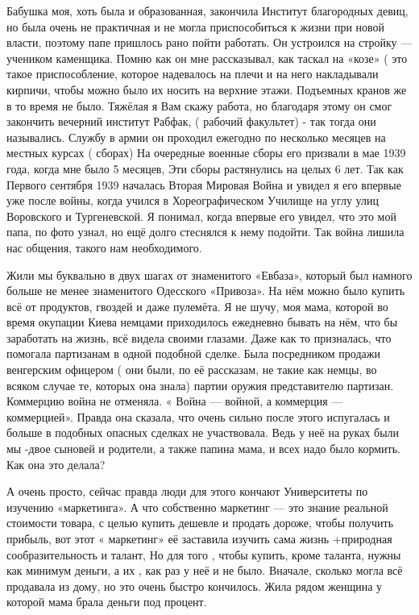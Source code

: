 
Бабушка моя, хоть была и образованная, закончила
Институт благородных девиц, но была очень не практичная  и не могла
приспособиться к жизни при новой власти, поэтому папе пришлось рано пойти
работать. Он устроился на стройку — учеником каменщика. Помню как он мне
рассказывал, как таскал на «козе» ( это такое приспособление, которое
надевалось на плечи и на него накладывали кирпичи, чтобы можно было их носить
на верхние этажи. Подъемных кранов же в то время не было. Тяжёлая я Вам скажу
работа, но благодаря этому он смог закончить вечерний институт  Рабфак, (
рабочий факультет) - так  тогда они назывались. Службу в армии он проходил
ежегодно по несколько месяцев  на  местных  курсах ( сборах)  На очередные
военные сборы его призвали  в мае 1939 года, когда мне было 5 месяцев, Эти
сборы растянулись на целых 6 лет. Так как Первого сентября 1939 началась Вторая
Мировая Война и увидел я его впервые уже после войны, когда учился в
Хореографическом Училище на углу улиц Воровского и Тургеневской.  Я понимал,
когда впервые его увидел, что это мой папа, по фото  узнал, но  ещё долго
стеснялся  к нему подойти. Так война лишила нас общения, такого  нам
необходимого.


Жили мы буквально в двух шагах от знаменитого «Евбаза», который был намного
больше не менее знаменитого Одесского «Привоза». На нём можно было купить всё
от продуктов, гвоздей и даже пулемёта. Я не шучу, моя мама, которой  во время
окупации Киева немцами приходилось ежедневно бывать на нём, что бы заработать
на жизнь, всё видела  своими глазами. Даже как то призналась, что помогала
партизанам  в одной подобной сделке. Была посредником продажи  венгерским
офицером ( они были, по её рассказам, не такие как немцы, во всяком случае те,
которых она знала)  партии оружия представителю партизан. Коммерцию война не
отменяла. « Война — войной, а коммерция — коммерцией». Правда она сказала, что
очень сильно после этого испугалась и больше в подобных опасных сделках не
участвовала. Ведь у неё на руках были мы -двое сыновей и родители, а также
папина мама, и всех  надо было кормить.    Как она это делала?

А очень просто, сейчас правда люди для этого кончают Университеты по изучению
«маркетинга». А что собственно маркетинг — это знание реальной стоимости
товара, с целью купить дешевле и продать дороже, чтобы получить прибыль, вот
этот « маркетинг» её заставила изучить сама  жизнь +природная сообразительность
и талант, Но для того , чтобы купить, кроме таланта, нужны как минимум деньги,
а их , как раз у неё и не было. Вначале, сколько могла всё продавала из дому,
но это очень быстро кончилось.  Жила рядом женщина у которой мама  брала деньги
под процент. 

